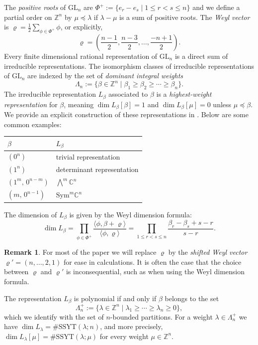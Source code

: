 \documentclass{amsart}
\newcommand\SSYT{\mathrm{SSYT}}
\newcommand\GL{\mathrm{GL}}
\newcommand\Z{\mathbb{Z}}
\theoremstyle{plain}
\theoremstyle{definition}
\newtheorem{remark}[remark]{Remark}
\numberwithin{equation}{section}
\begin{document}
The \emph{positive roots} of $\GL_n$ are $\Phi^+:=\{e_r-e_s\mid 1\leq r<s\leq n\}$ and we define a partial order on $\mathbb{Z}^n$ by $\mu\preceq\lambda$ if $\lambda-\mu$ is a sum of positive roots. The \emph{Weyl vector} is $\varrho=\frac{1}{2}\sum_{\phi\in\Phi^+}\phi$, or explicitly,
\[\varrho=\left(\frac{n-1}{2},\frac{n-3}{2},\dots,\frac{-n+1}{2}\right).\]
% 
Every finite dimensional rational representation of $\GL_n$ is a direct sum of irreducible representations. The isomorphism classes of irreducible representations of $\GL_n$ are indexed by the set of \emph{dominant integral weights}
\[\Lambda_n:=\{\beta\in\Z^n\mid \beta_1\geq\beta_2\geq\cdots\geq\beta_n\}.\]
The irreducible representation $L_\beta$ associated to $\beta$ is a \emph{highest-weight representation} for $\beta$, meaning $\dim L_\beta[\beta]=1$ and $\dim L_\beta[\mu]=0$ unless $\mu\preceq\beta$. We provide an explicit construction of these representations in . Below are some common examples:
\begin{center}
\begin{tabular}{l l}
$\beta$ & $L_\beta$ \\
\hline
$(0^n)$ & trivial representation\\
$(1^n)$ & determinant representation\\
$(1^m, \,0^{n-m})$ & ${\bigwedge}^m\mathbb{C}^n$ \\
$(m,\,0^{n-1})$ & $\mathrm{Sym}^m\mathbb{C}^n$
\end{tabular}
\end{center}
% 
The dimension of $L_\beta$ is given by the Weyl dimension formula:
\[\dim L_\beta=\prod_{\phi\in\Phi^+}\frac{\langle \phi,\beta+\varrho\rangle}{\langle\phi,\varrho\rangle}=
\prod_{1\leq r<s\leq n}\frac{\beta_r-\beta_s+s-r}{s-r}.\]
% 
\begin{remark}
    For most of the paper we will replace $\varrho$ by the \emph{shifted Weyl vector} $\varrho'=(n,\dots,2,1)$ for ease in calculations. It is often the case that the choice between $\varrho$ and $\varrho'$ is inconsequential, such as when using the Weyl dimension formula.
\end{remark}
% 
The representation $L_\beta$ is polynomial if and only if $\beta$ belongs to the set
\[\Lambda_n^+:=\{\lambda\in\mathbb{Z}^n\mid \lambda_1\geq\cdots\geq\lambda_n\geq 0\},\]
which we identify with the set of $n$-bounded partitions. For a weight $\lambda\in\Lambda_{n}^+$ we have $\dim L_\lambda=\#\mathrm{SSYT}(\lambda;n)$, and more precisely, $\dim L_\lambda[\mu]=\#\SSYT(\lambda;\mu)$ for every weight $\mu\in\mathbb{Z}^n$.
\end{document}
